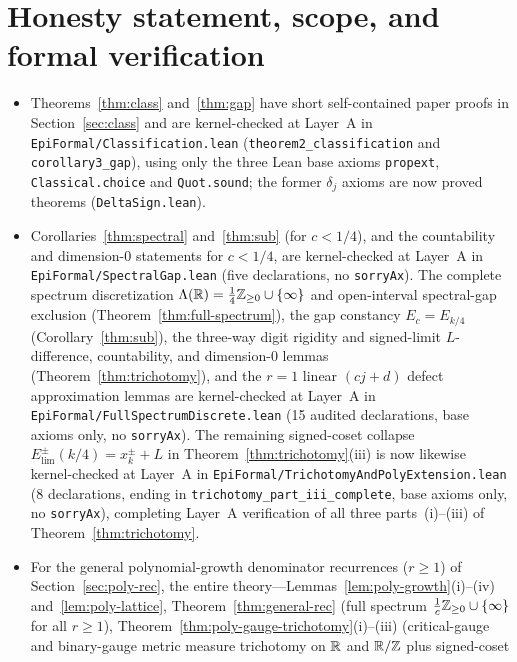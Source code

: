 \section{Honesty statement, scope, and formal verification}\label{sec:verification}

\begin{itemize}[leftmargin=1.5em]
\item Theorems~\ref{thm:class} and~\ref{thm:gap} have short self-contained paper
proofs in Section~\ref{sec:class} and are kernel-checked at Layer~A in
\texttt{EpiFormal/\allowbreak Classification.lean}
(\texttt{theorem2\_classification} and \texttt{corollary3\_gap}), using only the
three Lean base axioms \texttt{propext}, \texttt{Classical.choice} and
\texttt{Quot.sound}; the former $\delta_j$ axioms are now proved theorems
(\texttt{DeltaSign.lean}).
\item Corollaries~\ref{thm:spectral} and~\ref{thm:sub} (for $c<1/4$), and the
countability and dimension-$0$ statements for $c<1/4$, are kernel-checked at
Layer~A in \texttt{EpiFormal/\allowbreak SpectralGap.lean} (five declarations,
no \texttt{sorryAx}). The complete spectrum discretization
$\Lambda(\mathbb{R})=\frac14\mathbb{Z}_{\ge0}\cup\{\infty\}$ and open-interval spectral-gap
exclusion (Theorem~\ref{thm:full-spectrum}), the gap constancy $E_c=E_{k/4}$
(Corollary~\ref{thm:sub}), the three-way digit rigidity and signed-limit
$L$-difference, countability, and dimension-$0$ lemmas
(Theorem~\ref{thm:trichotomy}), and the $r=1$ linear $(cj+d)$ defect
approximation lemmas are kernel-checked at Layer~A in
\texttt{EpiFormal/\allowbreak FullSpectrumDiscrete.lean} (15 audited
declarations, base axioms only, no \texttt{sorryAx}). The remaining signed-coset
collapse $E_{\mathrm{lim}}^\pm(k/4)=x_k^\pm+L$ in
Theorem~\ref{thm:trichotomy}(iii) is now likewise kernel-checked at Layer~A in
\texttt{EpiFormal/\allowbreak TrichotomyAndPolyExtension.lean} (8 declarations,
ending in \texttt{trichotomy\_\allowbreak part\_\allowbreak iii\_\allowbreak complete},
base axioms only, no \texttt{sorryAx}), completing Layer~A verification of all
three parts~(i)--(iii) of Theorem~\ref{thm:trichotomy}.
\item For the general polynomial-growth denominator recurrences ($r\ge1$) of
Section~\ref{sec:poly-rec}, the entire theory---Lemmas~\ref{lem:poly-growth}(i)--(iv)
and~\ref{lem:poly-lattice}, Theorem~\ref{thm:general-rec} (full spectrum
$\frac{1}{c}\mathbb{Z}_{\ge0}\cup\{\infty\}$ for all $r\ge1$),
Theorem~\ref{thm:poly-gauge-trichotomy}(i)--(iii) (critical-gauge and
binary-gauge metric measure trichotomy on $\mathbb{R}$ and $\mathbb{R}/\mathbb{Z}$ plus signed-coset

\end{itemize}
